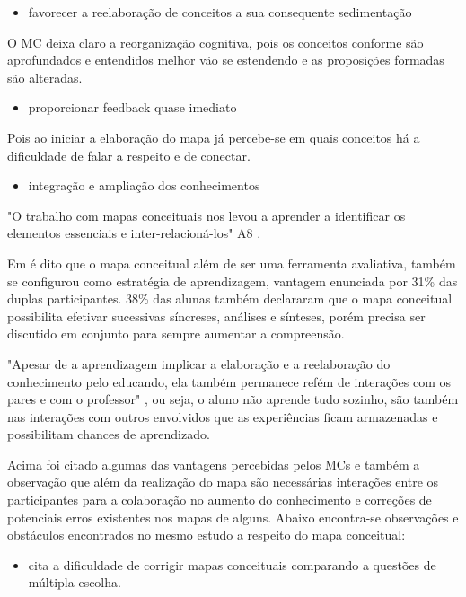 \begin{itemize}
\item favorecer a reelaboração de conceitos a sua consequente sedimentação
\end{itemize}

O MC deixa claro a reorganização cognitiva, pois os conceitos conforme são aprofundados e entendidos melhor vão se estendendo e as proposições formadas são alteradas.\cite{vantagensDesvantagensMC}

\begin{itemize}
\item proporcionar feedback quase imediato
\end{itemize}

Pois ao iniciar a elaboração do mapa já percebe-se em quais conceitos há a dificuldade de falar a respeito e de conectar.


\begin{itemize}
\item integração e ampliação dos conhecimentos
\end{itemize}
"O trabalho com mapas conceituais nos levou a aprender a identificar os elementos essenciais e inter-relacioná-los" A8 \cite{vantagensDesvantagensMC}.

Em \cite{vantagensDesvantagensMC} é dito que o mapa conceitual além de ser uma ferramenta avaliativa, também se configurou como estratégia de aprendizagem, vantagem enunciada por 31\% das duplas participantes.
38\% das alunas também declararam que o mapa conceitual possibilita efetivar sucessivas síncreses, análises e sínteses, porém precisa ser discutido em conjunto para sempre aumentar a compreensão.

"Apesar de a aprendizagem implicar a elaboração e a reelaboração do conhecimento pelo educando, ela também permanece refém de interações com os pares e com o professor" \cite[p. 180]{vantagensDesvantagensMC}, ou seja, o aluno não aprende tudo sozinho, são também nas interações com outros envolvidos que as experiências ficam armazenadas e possibilitam chances de aprendizado.

Acima foi citado algumas das vantagens percebidas pelos MCs e também a observação que além da realização do mapa são necessárias interações entre os participantes para a colaboração no aumento do conhecimento e correções de potenciais erros existentes nos mapas de alguns. Abaixo encontra-se observações e obstáculos encontrados no mesmo estudo a respeito do mapa conceitual: 

\begin{itemize}
 \item  \cite{dificuldadesMapaConceitual} cita a dificuldade de corrigir mapas conceituais comparando a questões de múltipla escolha. 
\end{itemize}

